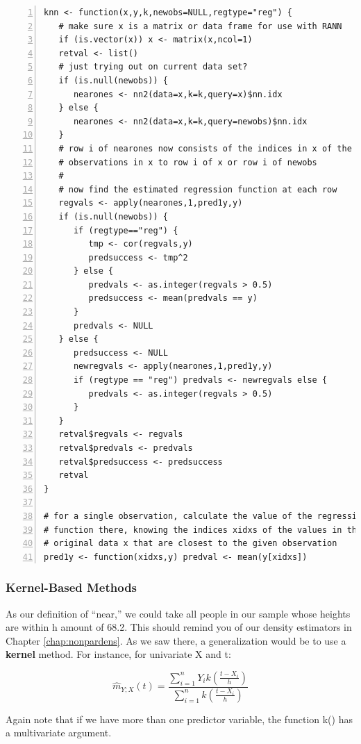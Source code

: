 \begin{lstlisting}[numbers=left]
knn <- function(x,y,k,newobs=NULL,regtype="reg") {
   # make sure x is a matrix or data frame for use with RANN
   if (is.vector(x)) x <- matrix(x,ncol=1)
   retval <- list()
   # just trying out on current data set?
   if (is.null(newobs)) {
      nearones <- nn2(data=x,k=k,query=x)$nn.idx
   } else {
      nearones <- nn2(data=x,k=k,query=newobs)$nn.idx
   }
   # row i of nearones now consists of the indices in x of the k closest
   # observations in x to row i of x or row i of newobs
   #
   # now find the estimated regression function at each row
   regvals <- apply(nearones,1,pred1y,y)
   if (is.null(newobs)) {
      if (regtype=="reg") {
         tmp <- cor(regvals,y)
         predsuccess <- tmp^2
      } else {
         predvals <- as.integer(regvals > 0.5)
         predsuccess <- mean(predvals == y)
      }
      predvals <- NULL
   } else {
      predsuccess <- NULL 
      newregvals <- apply(nearones,1,pred1y,y)
      if (regtype == "reg") predvals <- newregvals else {
         predvals <- as.integer(regvals > 0.5)  
      }
   }
   retval$regvals <- regvals
   retval$predvals <- predvals
   retval$predsuccess <- predsuccess
   retval
}

# for a single observation, calculate the value of the regression
# function there, knowing the indices xidxs of the values in the
# original data x that are closest to the given observation
pred1y <- function(xidxs,y) predval <- mean(y[xidxs])

\end{lstlisting}

\subsubsection{Kernel-Based Methods}

As our definition of ``near,'' we could take all people in our sample
whose heights are within h amount of 68.2.  This should remind you of
our density estimators in Chapter \ref{chap:nonpardens}.  As we saw
there, a generalization would be to use a {\bf kernel} method.  For
instance, for univariate X and t:

\begin{equation}
\widehat{m}_{Y;X}(t) = \frac
{\sum_{i=1}^{n} Y_i k\left ( \frac{t-X_i}{h}   \right ) }
{\sum_{i=1}^{n} k\left ( \frac{t-X_i}{h}   \right ) }
\end{equation}

Again note that if we have more than one predictor variable, the
function k() has a multivariate argument.

